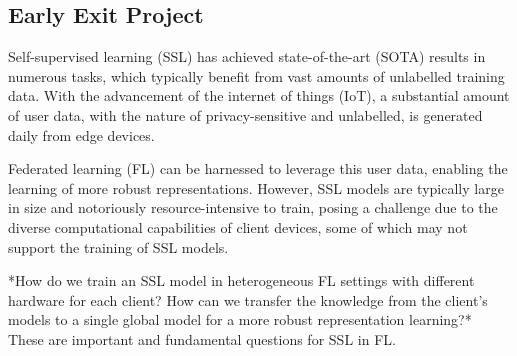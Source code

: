 \documentclass[withindex,glossary,firstyr]{cam-thesis}
\begin{document}



\subsection{Early Exit Project}

Self-supervised learning (SSL) has achieved state-of-the-art (SOTA) results in numerous tasks, which typically benefit from vast amounts of unlabelled training data.  With the advancement of the internet of things (IoT), a substantial amount of user data, with the nature of privacy-sensitive and unlabelled, is generated daily from edge devices. 

Federated learning (FL) can be harnessed to leverage this user data, enabling the learning of more robust representations. However, SSL models are typically large in size and notoriously resource-intensive to train, posing a challenge due to the diverse computational capabilities of client devices, some of which may not support the training of SSL models.

*How do we train an SSL model in heterogeneous FL settings with different hardware for each client? How can we transfer the knowledge from the client’s models to a single global model for a more robust representation learning?* These are important and fundamental questions for SSL in FL.
\end{document}
